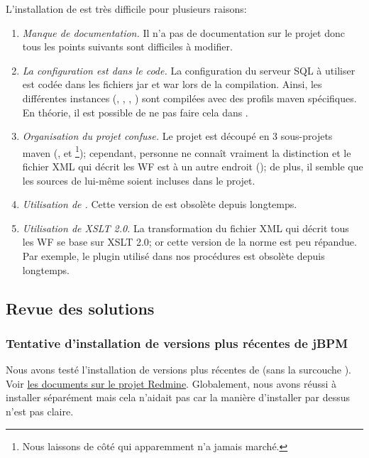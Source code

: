 L'installation de  est très difficile pour plusieurs raisons:
\begin{enumerate}
    \item \emph{Manque de documentation.} Il n'a pas de documentation sur le projet donc tous les points suivants sont difficiles à modifier.
    \item \emph{La configuration est dans le code.} La configuration du serveur SQL à utiliser est codée dans les fichiers jar et war lors de la compilation.
           Ainsi, les différentes instances (, , , ) sont compilées avec des profils maven spécifiques.
           En théorie, il est possible de ne pas faire cela dans .
    \item \emph{Organisation du projet confuse.} Le projet est découpé en 3 sous-projets maven (,  et \footnote{Nous laissons de côté  qui apparemment n'a jamais marché.});
          cependant, personne ne connaît vraiment la distinction et le fichier XML qui décrit les WF est à un autre endroit ();
          de plus, il semble que les sources de  lui-même soient incluses dans le projet.
    \item \emph{Utilisation de .} Cette version de  est obsolète depuis longtemps.
    \item \emph{Utilisation de XSLT 2.0.} La transformation du fichier XML qui décrit tous les WF se base sur XSLT 2.0;
          or cette version de la norme est peu répandue.
          Par exemple, le plugin  utilisé dans nos procédures est obsolète depuis longtemps.
\end{enumerate}

\subsection{Revue des solutions}

\subsubsection{Tentative d'installation de versions plus récentes de jBPM}

Nous avons testé l'installation de versions plus récentes de  (sans la surcouche ).
Voir \href{https://intranet.genoscope.cns.fr/agc/redmine/documents/88}{les documents sur le projet Redmine}.
Globalement, nous avons réussi à installer  séparément mais cela n'aidait pas
car la manière d'installer  par dessus n'est pas claire.

